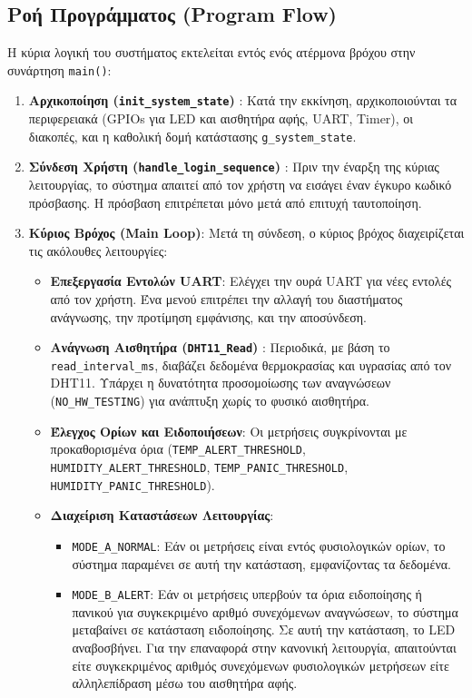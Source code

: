 \documentclass{article}
\begin{document}
\subsection{Ροή Προγράμματος (Program Flow)}
Η κύρια λογική του συστήματος εκτελείται εντός ενός ατέρμονα βρόχου στην συνάρτηση \texttt{main()}:
\begin{enumerate}
    \item \textbf{Αρχικοποίηση (\texttt{init\_system\_state})} : Κατά την εκκίνηση, αρχικοποιούνται τα περιφερειακά (GPIOs για LED και αισθητήρα αφής, UART, Timer), οι διακοπές, και η καθολική δομή κατάστασης \texttt{g\_system\_state}.
    \item \textbf{Σύνδεση Χρήστη (\texttt{handle\_login\_sequence})} : Πριν την έναρξη της κύριας λειτουργίας, το σύστημα απαιτεί από τον χρήστη να εισάγει έναν έγκυρο κωδικό πρόσβασης. Η πρόσβαση επιτρέπεται μόνο μετά από επιτυχή ταυτοποίηση.
    \item \textbf{Κύριος Βρόχος (Main Loop)}: Μετά τη σύνδεση, ο κύριος βρόχος διαχειρίζεται τις ακόλουθες λειτουργίες:
    \begin{itemize}
        \item \textbf{Επεξεργασία Εντολών UART}: Ελέγχει την ουρά UART για νέες εντολές από τον χρήστη. Ένα μενού επιτρέπει την αλλαγή του διαστήματος ανάγνωσης, την προτίμηση εμφάνισης, και την αποσύνδεση.
        \item \textbf{Ανάγνωση Αισθητήρα (\texttt{DHT11\_Read})} : Περιοδικά, με βάση το \texttt{read\_interval\_ms}, διαβάζει δεδομένα θερμοκρασίας και υγρασίας από τον DHT11. Υπάρχει η δυνατότητα προσομοίωσης των αναγνώσεων (\texttt{NO\_HW\_TESTING}) για ανάπτυξη χωρίς το φυσικό αισθητήρα.
        \item \textbf{Έλεγχος Ορίων και Ειδοποιήσεων}: Οι μετρήσεις συγκρίνονται με προκαθορισμένα όρια (\texttt{TEMP\_ALERT\_THRESHOLD}, \texttt{HUMIDITY\_ALERT\_THRESHOLD}, \texttt{TEMP\_PANIC\_THRESHOLD}, \texttt{HUMIDITY\_PANIC\_THRESHOLD}).
        \item \textbf{Διαχείριση Καταστάσεων Λειτουργίας}:
        \begin{itemize}
            \item \texttt{MODE\_A\_NORMAL}: Εάν οι μετρήσεις είναι εντός φυσιολογικών ορίων, το σύστημα παραμένει σε αυτή την κατάσταση, εμφανίζοντας τα δεδομένα.
            \item \texttt{MODE\_B\_ALERT}: Εάν οι μετρήσεις υπερβούν τα όρια ειδοποίησης ή πανικού για συγκεκριμένο αριθμό συνεχόμενων αναγνώσεων, το σύστημα μεταβαίνει σε κατάσταση ειδοποίησης. Σε αυτή την κατάσταση, το LED αναβοσβήνει. Για την επαναφορά στην κανονική λειτουργία, απαιτούνται είτε συγκεκριμένος αριθμός συνεχόμενων φυσιολογικών μετρήσεων είτε αλληλεπίδραση μέσω του αισθητήρα αφής.

\end{itemize}
\end{itemize}
\end{enumerate}
\end{document}
